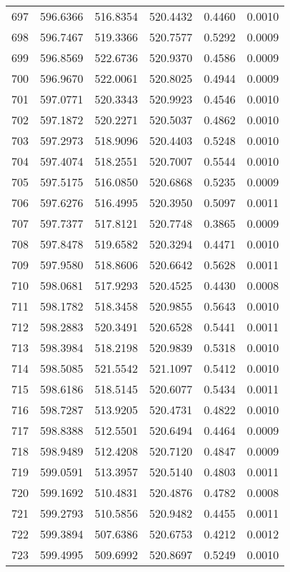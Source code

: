 \documentclass{article}
\begin{document}
\begin{longtable}{|c|c|c|c|c|c|}
697 & 596.6366 & 516.8354 & 520.4432 & 0.4460 & 0.0010 \\
698 & 596.7467 & 519.3366 & 520.7577 & 0.5292 & 0.0009 \\
699 & 596.8569 & 522.6736 & 520.9370 & 0.4586 & 0.0009 \\
700 & 596.9670 & 522.0061 & 520.8025 & 0.4944 & 0.0009 \\
701 & 597.0771 & 520.3343 & 520.9923 & 0.4546 & 0.0010 \\
702 & 597.1872 & 520.2271 & 520.5037 & 0.4862 & 0.0010 \\
703 & 597.2973 & 518.9096 & 520.4403 & 0.5248 & 0.0010 \\
704 & 597.4074 & 518.2551 & 520.7007 & 0.5544 & 0.0010 \\
705 & 597.5175 & 516.0850 & 520.6868 & 0.5235 & 0.0009 \\
706 & 597.6276 & 516.4995 & 520.3950 & 0.5097 & 0.0011 \\
707 & 597.7377 & 517.8121 & 520.7748 & 0.3865 & 0.0009 \\
708 & 597.8478 & 519.6582 & 520.3294 & 0.4471 & 0.0010 \\
709 & 597.9580 & 518.8606 & 520.6642 & 0.5628 & 0.0011 \\
710 & 598.0681 & 517.9293 & 520.4525 & 0.4430 & 0.0008 \\
711 & 598.1782 & 518.3458 & 520.9855 & 0.5643 & 0.0010 \\
712 & 598.2883 & 520.3491 & 520.6528 & 0.5441 & 0.0011 \\
713 & 598.3984 & 518.2198 & 520.9839 & 0.5318 & 0.0010 \\
714 & 598.5085 & 521.5542 & 521.1097 & 0.5412 & 0.0010 \\
715 & 598.6186 & 518.5145 & 520.6077 & 0.5434 & 0.0011 \\
716 & 598.7287 & 513.9205 & 520.4731 & 0.4822 & 0.0010 \\
717 & 598.8388 & 512.5501 & 520.6494 & 0.4464 & 0.0009 \\
718 & 598.9489 & 512.4208 & 520.7120 & 0.4847 & 0.0009 \\
719 & 599.0591 & 513.3957 & 520.5140 & 0.4803 & 0.0011 \\
720 & 599.1692 & 510.4831 & 520.4876 & 0.4782 & 0.0008 \\
721 & 599.2793 & 510.5856 & 520.9482 & 0.4455 & 0.0011 \\
722 & 599.3894 & 507.6386 & 520.6753 & 0.4212 & 0.0012 \\
723 & 599.4995 & 509.6992 & 520.8697 & 0.5249 & 0.0010 \\

\end{longtable}
\end{document}
